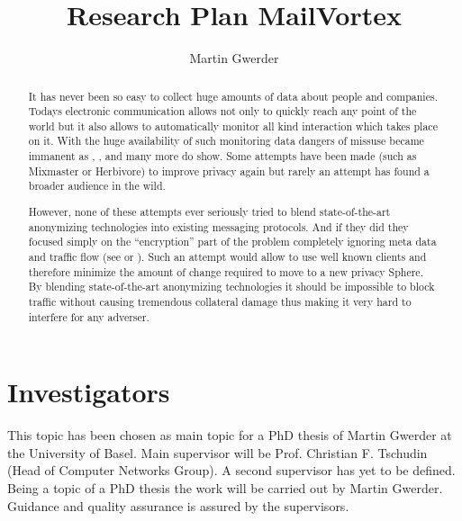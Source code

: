 \documentclass[twocolumn,a4paper,10pt,english]{article}
\begin{document}
\title{Research Plan MailVortex}
\author{Martin Gwerder}
\date{\SVNDate}

\maketitle

\begin{abstract}It has never been so easy to collect huge amounts of data about people and companies. Todays electronic communication allows not only to quickly reach any point of the world but it also allows to automatically monitor all kind interaction which takes place on it. With the huge availability of such monitoring data dangers of missuse became immanent as \cite{ECHELON}, \cite{wiki:prism}, \cite{wiki:tempora} and many more do show. Some attempts have been made (such as Mixmaster\cite{mixmaster-spec} or Herbivore\cite{herbivore:tr}) to improve privacy again but rarely an attempt has found a broader audience in the wild. \par

However, none of these attempts ever seriously tried to blend state-of-the-art anonymizing technologies into existing messaging protocols. And if they did they focused simply on the ``encryption'' part of the problem completely ignoring meta data and traffic flow (see \cite{RFC3851} or \cite{RFC2015}). Such an attempt  would allow to use well known clients and therefore minimize the amount of change required to move to a new privacy Sphere. By blending state-of-the-art anonymizing technologies it should be impossible to block traffic without causing tremendous collateral damage thus making it very hard to interfere for any adverser. 
\end{abstract}

\section{Investigators}
This topic has been chosen as main topic for a PhD thesis of Martin Gwerder at the University of Basel. Main supervisor will be Prof. Christian F. Tschudin (Head of Computer Networks Group). A second supervisor has yet to be defined. Being a topic of a PhD thesis the work will be carried out by Martin Gwerder. Guidance and quality assurance is assured by the supervisors.
\end{document}
